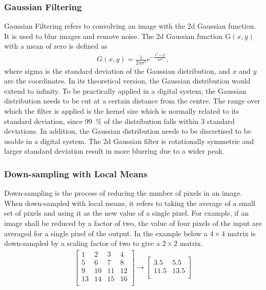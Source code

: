 \subsubsection{Gaussian Filtering} \label{sec:t_gauss}
Gaussian Filtering refers to convolving an image with the \gls{2d} Gaussian function. It is used to blur images and remove noise. The \gls{2d} Gaussian function \gls{G}$(x,y)$ with a mean of zero is defined as
\begin{align}
    G(x,y) = \frac{1}{2\pi \sigma^{2}}e^{-\frac{x^2+y^2}{2\sigma^2}}, \label{eq:gauss_2d}
\end{align}
where \gls{sigma} is the standard deviation of the Gaussian distribution, and $x$ and $y$ are the coordinates.
In its theoretical version, the Gaussian distribution would extend to infinity. To be practically applied in a digital system, the Gaussian distribution needs to be cut at a certain distance from the centre. The range over which the filter is applied is the kernel size which is normally related to its standard deviation, since \SI{99}{\percent} of the distribution falls within 3 standard deviations. In addition, the Gaussian distribution needs to be discretised to be usable in a digital system. The \gls{2d} Gaussian filter is rotationally symmetric and larger standard deviation result in more blurring due to a wider peak.

\subsubsection{Down-sampling with Local Means} \label{sec:t_downsample}
Down-sampling is the process of reducing the number of pixels in an image. When down-sampled with local means, it refers to taking the average of a small set of pixels and using it as the new value of a single pixel. For example, if an image shall be reduced by a factor of two, the value of four pixels of the input are averaged for a single pixel of the output. In the example below a $4\times4$ matrix is down-sampled by a scaling factor of two to give a $2\times2$ matrix.
\begin{align*}
    \begin{bmatrix}
        1  & 2  & 3  & 4\\
        5  & 6  & 7  & 8\\
        9  & 10 & 11 & 12\\
        13 & 14 & 15 & 16\\
    \end{bmatrix} 
    \rightarrow 
    \begin{bmatrix}
        3.5  & 5.5\\
        11.5 & 13.5\\ 
    \end{bmatrix}
\end{align*}
